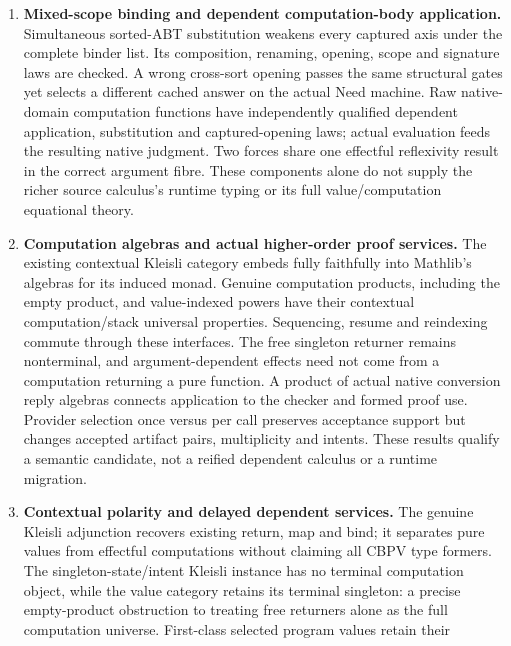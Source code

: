 \documentclass[11pt]{article}
\theoremstyle{definition}
\theoremstyle{remark}
\begin{document}
\begin{enumerate}
  template executes in seven actual transitions for every loaded native
  argument; independent argument admission licenses its returned identity
  proof. Reverse typing conservativity and independent natural adequacy for
  the richer constructors are not consequences of these results.
\item \textbf{Mixed-scope binding and dependent computation-body application.}
  Simultaneous sorted-ABT substitution weakens every captured axis under the
  complete binder list. Its composition, renaming, opening, scope and
  signature laws are checked. A wrong cross-sort opening passes the same
  structural gates yet selects a different cached answer on the actual
  Need machine. Raw native-domain computation functions have independently
  qualified dependent application, substitution and captured-opening laws;
  actual evaluation feeds the resulting native judgment. Two forces share
  one effectful reflexivity result in the correct argument fibre. These
  components alone do not supply the richer source calculus's runtime
  typing or its full value/computation equational theory.
\item \textbf{Computation algebras and actual higher-order proof services.}
  The existing contextual Kleisli category embeds fully faithfully into
  Mathlib's algebras for its induced monad. Genuine computation products,
  including the empty product, and value-indexed powers have their
  contextual computation/stack universal properties. Sequencing, resume
  and reindexing commute through these interfaces. The free singleton
  returner remains nonterminal, and argument-dependent effects need not
  come from a computation returning a pure function.
  A product of actual native conversion reply algebras connects application
  to the checker and formed proof use. Provider selection once versus per
  call preserves acceptance support but changes accepted artifact pairs,
  multiplicity and intents. These results qualify a semantic candidate,
  not a reified dependent calculus or a runtime migration.
\item \textbf{Contextual polarity and delayed dependent services.}
  The genuine Kleisli adjunction recovers existing return, map and bind;
  it separates pure values from effectful computations without claiming
  all CBPV type formers. The singleton-state/intent Kleisli instance has no
  terminal computation object, while the value category retains its terminal
  singleton: a precise empty-product obstruction to treating free returners
  alone as the full computation universe. First-class selected program values retain their

\end{enumerate}
\end{document}
